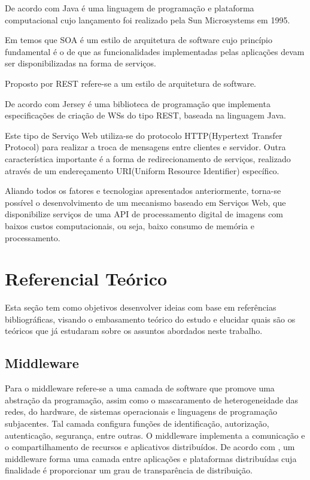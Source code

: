 \documentclass[12pt]{article}
\begin{document}
De acordo com \cite{oracle} Java é uma linguagem de programação e plataforma computacional cujo lançamento foi realizado pela Sun Microsystems em 1995.

Em \cite{soa1,soa2} temos que SOA é um estilo de arquitetura de software cujo princípio fundamental é o de que as funcionalidades implementadas pelas aplicações devam ser disponibilizadas na forma de serviços.

Proposto por \cite{rest} REST refere-se a um estilo de arquitetura de software.

De acordo com \cite{jersey} Jersey é uma biblioteca de programação que implementa especificações de criação de WSs do tipo REST, baseada na linguagem Java.

Este tipo de Serviço Web utiliza-se do protocolo HTTP(Hypertext Transfer Protocol) para realizar a troca
de mensagens entre clientes e servidor. Outra característica importante é a forma de
redirecionamento de serviços, realizado através de um endereçamento URI(Uniform Resource Identifier)
específico.

Aliando todos os fatores e tecnologias apresentados anteriormente, torna-se
possível o desenvolvimento de um mecanismo baseado em Serviços Web, que disponibilize serviços de uma API de processamento digital de imagens
com baixos custos computacionais, ou seja, baixo consumo de memória e processamento.

\section{Referencial Teórico} \label{sec:firstpage}

Esta seção tem como objetivos desenvolver ideias com base em referências bibliográficas, visando o embasamento teórico do estudo e elucidar quais são os teóricos que já estudaram sobre os assuntos abordados neste trabalho.

\subsection{Middleware}

Para \cite{coulouris:05} o middleware refere-se a uma camada de software
que promove uma abstração da programação, assim como o mascaramento de
heterogeneidade das redes, do hardware, de sistemas operacionais e linguagens de
programação subjacentes. Tal camada configura funções de identificação, autorização,
autenticação, segurança, entre outras. O middleware implementa a comunicação e o
compartilhamento de recursos e aplicativos distribuídos.
De acordo com \cite{tanenbaum:07}, um middleware forma uma camada entre aplicações e plataformas distribuídas
cuja finalidade é proporcionar um grau de transparência de distribuição. 
\end{document}
